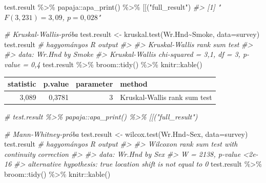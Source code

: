 \documentclass[
]{book}
\newenvironment{Shaded}{\begin{snugshade}}{\end{snugshade}}
\newcommand{\AttributeTok}[1]{\textcolor[rgb]{0.77,0.63,0.00}{#1}}
\newcommand{\CommentTok}[1]{\textcolor[rgb]{0.56,0.35,0.01}{\textit{#1}}}
\newcommand{\FunctionTok}[1]{\textcolor[rgb]{0.00,0.00,0.00}{#1}}
\newcommand{\NormalTok}[1]{#1}
\newcommand{\OtherTok}[1]{\textcolor[rgb]{0.56,0.35,0.01}{#1}}
\newcommand{\SpecialCharTok}[1]{\textcolor[rgb]{0.00,0.00,0.00}{#1}}
\newcommand{\StringTok}[1]{\textcolor[rgb]{0.31,0.60,0.02}{#1}}
\begin{document}
\begin{Shaded}
\begin{Highlighting}[]
\NormalTok{test.result }\SpecialCharTok{\%\textgreater{}\%}\NormalTok{ papaja}\SpecialCharTok{::}\FunctionTok{apa\_print}\NormalTok{() }\SpecialCharTok{\%\textgreater{}\%} \StringTok{\textasciigrave{}}\AttributeTok{[[}\StringTok{\textasciigrave{}}\NormalTok{(}\StringTok{"full\_result"}\NormalTok{)}
\CommentTok{\#\textgreater{} [1] "$F(3, 231) = 3,09$, $p = 0,028$"}


\CommentTok{\# Kruskal{-}Wallis{-}próba}
\NormalTok{test.result }\OtherTok{\textless{}{-}} \FunctionTok{kruskal.test}\NormalTok{(Wr.Hnd}\SpecialCharTok{\textasciitilde{}}\NormalTok{Smoke, }\AttributeTok{data=}\NormalTok{survey)}
\NormalTok{test.result   }\CommentTok{\# hagyományos R output}
\CommentTok{\#\textgreater{} }
\CommentTok{\#\textgreater{}  Kruskal{-}Wallis rank sum test}
\CommentTok{\#\textgreater{} }
\CommentTok{\#\textgreater{} data:  Wr.Hnd by Smoke}
\CommentTok{\#\textgreater{} Kruskal{-}Wallis chi{-}squared = 3,1, df = 3, p{-}value = 0,4}
\NormalTok{test.result }\SpecialCharTok{\%\textgreater{}\%}\NormalTok{ broom}\SpecialCharTok{::}\FunctionTok{tidy}\NormalTok{() }\SpecialCharTok{\%\textgreater{}\%}\NormalTok{ knitr}\SpecialCharTok{::}\FunctionTok{kable}\NormalTok{()}
\end{Highlighting}
\end{Shaded}

\begin{tabular}{r|r|r|l}
\hline
statistic & p.value & parameter & method\\
\hline
3,089 & 0,3781 & 3 & Kruskal-Wallis rank sum test\\
\hline
\end{tabular}

\begin{Shaded}
\begin{Highlighting}[]
\CommentTok{\# test.result \%\textgreater{}\% papaja::apa\_print() \%\textgreater{}\% \textasciigrave{}[[\textasciigrave{}("full\_result")}


\CommentTok{\# Mann{-}Whitney{-}próba}
\NormalTok{test.result }\OtherTok{\textless{}{-}} \FunctionTok{wilcox.test}\NormalTok{(Wr.Hnd}\SpecialCharTok{\textasciitilde{}}\NormalTok{Sex, }\AttributeTok{data=}\NormalTok{survey)}
\NormalTok{test.result   }\CommentTok{\# hagyományos R output}
\CommentTok{\#\textgreater{} }
\CommentTok{\#\textgreater{}  Wilcoxon rank sum test with continuity correction}
\CommentTok{\#\textgreater{} }
\CommentTok{\#\textgreater{} data:  Wr.Hnd by Sex}
\CommentTok{\#\textgreater{} W = 2138, p{-}value \textless{}2e{-}16}
\CommentTok{\#\textgreater{} alternative hypothesis: true location shift is not equal to 0}
\NormalTok{test.result }\SpecialCharTok{\%\textgreater{}\%}\NormalTok{ broom}\SpecialCharTok{::}\FunctionTok{tidy}\NormalTok{() }\SpecialCharTok{\%\textgreater{}\%}\NormalTok{ knitr}\SpecialCharTok{::}\FunctionTok{kable}\NormalTok{()}
\end{Highlighting}
\end{Shaded}
\end{document}
